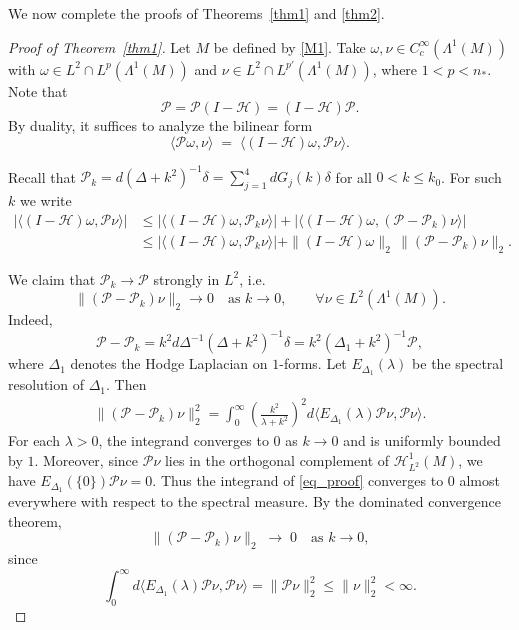 \documentclass[12pt]{amsart}
\begin{document}
We now complete the proofs of Theorems~\ref{thm1} and \ref{thm2}.

\begin{proof}[Proof of Theorem~\ref{thm1}]
Let $M$ be defined by \eqref{M1}.  
Take $\omega, \nu \in C_c^\infty(\Lambda^1(M))$ with $\omega \in L^2 \cap L^p(\Lambda^1(M))$ and $\nu \in L^2 \cap L^{p'}(\Lambda^1(M))$, where $1<p<n_*$.  
Note that
\[
\mathcal{P} = \mathcal{P}(I-\mathcal{H}) = (I-\mathcal{H})\mathcal{P}.
\]
By duality, it suffices to analyze the bilinear form
\[
\langle \mathcal{P}\omega, \nu \rangle \;=\; \langle (I-\mathcal{H})\omega, \mathcal{P}\nu \rangle.
\]

Recall that $\mathcal{P}_k = d(\Delta+k^2)^{-1}\delta = \sum_{j=1}^4 d G_j(k)\delta$ for all $0<k\le k_0$. For such $k$ we write
\begin{align*}
    |\langle (I-\mathcal{H}) \omega, \mathcal{P}\nu \rangle|
    &\le |\langle (I-\mathcal{H}) \omega, \mathcal{P}_k\nu \rangle|
       + |\langle (I-\mathcal{H}) \omega, (\mathcal{P}-\mathcal{P}_k)\nu \rangle| \\
    &\le |\langle (I-\mathcal{H}) \omega, \mathcal{P}_k\nu \rangle|
       + \|(I-\mathcal{H})\omega\|_2 \,\|(\mathcal{P}-\mathcal{P}_k)\nu\|_2.
\end{align*}

We claim that $\mathcal{P}_k \to \mathcal{P}$ strongly in $L^2$, i.e.\
\[
\|(\mathcal{P}-\mathcal{P}_k)\nu\|_2 \to 0 \quad \text{as } k\to 0,
\qquad \forall \nu \in L^2(\Lambda^1(M)).
\]
Indeed,
\[
\mathcal{P}-\mathcal{P}_k 
= k^2 d\Delta^{-1}(\Delta+k^2)^{-1}\delta
= k^2 (\Delta_1+k^2)^{-1}\mathcal{P},
\]
where $\Delta_1$ denotes the Hodge Laplacian on $1$-forms. Let $E_{\Delta_1}(\lambda)$ be the spectral resolution of $\Delta_1$. Then
\begin{align}\label{eq_proof}
    \|(\mathcal{P}-\mathcal{P}_k)\nu\|_2^2
    = \int_0^\infty \left(\frac{k^2}{\lambda+k^2}\right)^2
      d\langle E_{\Delta_1}(\lambda)\mathcal{P}\nu, \mathcal{P}\nu \rangle.
\end{align}
For each $\lambda>0$, the integrand converges to $0$ as $k\to0$ and is uniformly bounded by $1$. Moreover, since $\mathcal{P}\nu$ lies in the orthogonal complement of $\mathcal{H}^1_{L^2}(M)$, we have $E_{\Delta_1}(\{0\})\mathcal{P}\nu=0$. Thus the integrand of \eqref{eq_proof} converges to $0$ almost everywhere with respect to the spectral measure. By the dominated convergence theorem,
\[
\|(\mathcal{P}-\mathcal{P}_k)\nu\|_2 \;\to\; 0 \quad \text{as } k\to0,
\]
since
\[
\int_0^\infty d\langle E_{\Delta_1}(\lambda)\mathcal{P}\nu, \mathcal{P}\nu \rangle
= \|\mathcal{P}\nu\|_2^2 \le \|\nu\|_2^2 < \infty.
\]


\end{proof}
\end{document}
